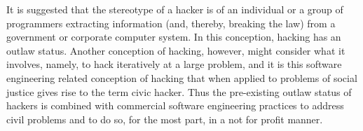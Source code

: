 It is suggested that the stereotype of a hacker is of an individual or a group of programmers extracting information (and, thereby, breaking the law) from a government or corporate computer system.
In this conception, hacking has an outlaw status.
Another conception of hacking, however, might consider what it involves, namely, to hack iteratively at a large problem,
and it is this software engineering related conception of hacking that when applied to problems of social justice gives rise to the term civic hacker.
Thus the pre-existing outlaw status of hackers is combined with commercial software engineering practices to address civil problems and to do so, for the most part, in a not for profit manner.